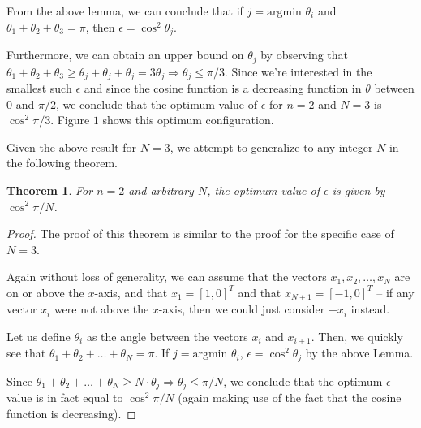 \documentclass[11pt,letterpaper,twoside,english]{article}
\theoremstyle{theorem}
\newtheorem{theorem}{Theorem}[section]
\theoremstyle{remark}
\begin{document}
From the above lemma, we can conclude that if $j = \text{argmin } \theta_i$ and $\theta_1 + \theta_2 + \theta_3 = \pi$, then $\epsilon = \cos^2 \theta_j$.

Furthermore, we can obtain an upper bound on $\theta_j$ by observing that $\theta_ 1 + \theta_ 2 + \theta_3 \geq \theta_ j + \theta_j + \theta_j = 3 \theta_j \Rightarrow \theta_j \leq \pi/3$. Since we're interested in the smallest such $\epsilon$ and since the cosine function is a decreasing function in $\theta$ between $0$ and $\pi/2$, we conclude that the optimum value of $\epsilon$ for $n=2$ and $N=3$ is $\cos^2 \pi / 3$. Figure $1$ shows this optimum configuration.

Given the above result for $N=3$, we attempt to generalize to any integer $N$ in the following theorem.

\begin{theorem}
For $n=2$ and arbitrary $N$, the optimum value of $\epsilon$ is given by $\cos^2 \pi/N$.
\end{theorem}

\begin{proof}
The proof of this theorem is similar to the proof for the specific case of $N=3$.

Again without loss of generality, we can assume that the vectors $x_1, x_2, \ldots, x_N$ are on or above the $x$-axis, and that $x_1 = [1,0]^T$ and that $x_{N+1} = [-1,0]^T$ -- if any vector $x_i$ were not above the $x$-axis, then we could just consider $-x_i$ instead.

Let us define $\theta_i$ as the angle between the vectors $x_i$ and $x_{i+1}$. Then, we quickly see that $\theta_1 + \theta_2 + \ldots + \theta_N = \pi$. If $j = \text{argmin } \theta_i$, $\epsilon = \cos^2 \theta_j$ by the above Lemma.

Since $\theta_ 1 + \theta_2 + \ldots + \theta_N \geq N \cdot \theta_j \Rightarrow \theta_j \leq \pi/N$, we conclude that the optimum $\epsilon$ value is in fact equal to $\cos^2 \pi/N$ (again making use of the fact that the cosine function is decreasing).
\end{proof}
\end{document}
